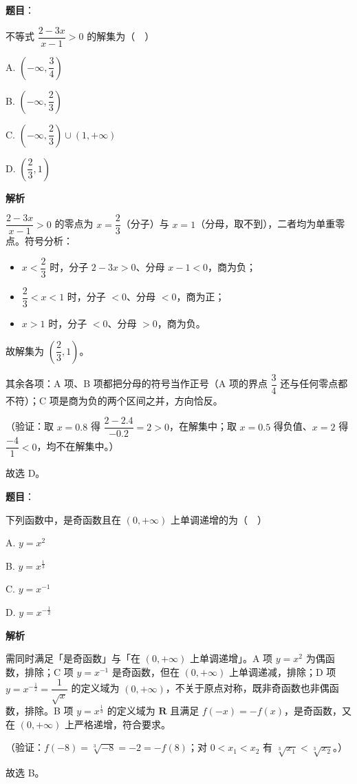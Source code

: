 \begin{answer}

\textbf{题目}：

不等式 \(\dfrac{2-3x}{x-1}>0\) 的解集为（　）

A. \(\left(-\infty,\dfrac{3}{4}\right)\)

B. \(\left(-\infty,\dfrac{2}{3}\right)\)

C. \(\left(-\infty,\dfrac{2}{3}\right)\cup(1,+\infty)\)

D. \(\left(\dfrac{2}{3},1\right)\)

\textbf{解析}

\(\dfrac{2-3x}{x-1}>0\) 的零点为 \(x=\dfrac{2}{3}\)（分子）与 \(x=1\)（分母，取不到），二者均为单重零点。符号分析：

\begin{itemize}
\item \(x<\dfrac{2}{3}\) 时，分子 \(2-3x>0\)、分母 \(x-1<0\)，商为负；
\item \(\dfrac{2}{3}<x<1\) 时，分子 \(<0\)、分母 \(<0\)，商为正；
\item \(x>1\) 时，分子 \(<0\)、分母 \(>0\)，商为负。
\end{itemize}

故解集为 \(\left(\dfrac{2}{3},1\right)\)。

其余各项：A 项、B 项都把分母的符号当作正号（A 项的界点 \(\dfrac{3}{4}\) 还与任何零点都不符）；C 项是商为负的两个区间之并，方向恰反。

（验证：取 \(x=0.8\) 得 \(\dfrac{2-2.4}{-0.2}=2>0\)，在解集中；取 \(x=0.5\) 得负值、\(x=2\) 得 \(\dfrac{-4}{1}<0\)，均不在解集中。）

故选 D。


\end{answer}
\begin{answer}

\textbf{题目}：

下列函数中，是奇函数且在 \((0,+\infty)\) 上单调递增的为（　）

A. \(y=x^{2}\)

B. \(y=x^{\frac{1}{3}}\)

C. \(y=x^{-1}\)

D. \(y=x^{-\frac{1}{2}}\)

\textbf{解析}

需同时满足「是奇函数」与「在 \((0,+\infty)\) 上单调递增」。A 项 \(y=x^{2}\) 为偶函数，排除；C 项 \(y=x^{-1}\) 是奇函数，但在 \((0,+\infty)\) 上单调递减，排除；D 项 \(y=x^{-\frac{1}{2}}=\dfrac{1}{\sqrt{x}}\) 的定义域为 \((0,+\infty)\)，不关于原点对称，既非奇函数也非偶函数，排除。B 项 \(y=x^{\frac{1}{3}}\) 的定义域为 \(\mathbf{R}\) 且满足 \(f(-x)=-f(x)\)，是奇函数，又在 \((0,+\infty)\) 上严格递增，符合要求。

（验证：\(f(-8)=\sqrt[3]{-8}=-2=-f(8)\)；对 \(0<x_{1}<x_{2}\) 有 \(\sqrt[3]{x_{1}}<\sqrt[3]{x_{2}}\)。）

故选 B。


\end{answer}
